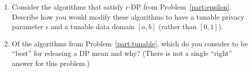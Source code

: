 \documentclass[11pt]{article}
\theoremstyle{plain}
\theoremstyle{definition}
\theoremstyle{solution}
\begin{document}
\begin{enumerate}[leftmargin=*]
\begin{enumerate}
            \item Consider the algorithms that satisfy $\epsilon$-DP from Problem~\ref{part:epsilon}. Describe how you would modify these algorithms
            to have a tunable privacy parameter $\epsilon$
            and a tunable data
            domain $[a,b]$ (rather than $[0,1]$). \label{part:tunable}
            \item Of the algorithms from Problem~\ref{part:tunable}, which do you consider to be ``best'' for releasing a DP mean and why?  (There is
            not a single ``right'' answer for this problem.)
            \iffalse

            \item If they satisfy the definition, what is the smallest value of $\epsilon$ for which they satisfy the definition?  Can you propose an adaptation that would provide greater utility to the release, as measured by mean squared error.
            \item If they do not meet the definition, propose a minimal change that would create an algorithm that does meet the definition, and again, provide the minimal value of $\epsilon$ that meets the definition.  (Minimal is subjective, but the smaller we judge your change, the better we will subjectively consider your answer.)
            \fi
        \end{enumerate}


\end{enumerate}
\end{document}
